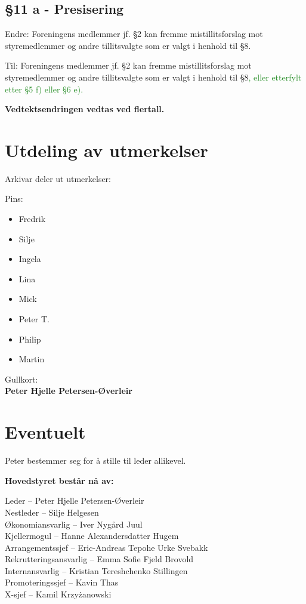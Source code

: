 \documentclass[10pt,norsk,a4paper,usenames,dvipsnames]{article}
\begin{document}
    \subsection{§11 a - Presisering}
    Endre:
    Foreningens medlemmer jf. §2 kan fremme mistillitsforslag mot styremedlemmer og andre tillitsvalgte som er valgt i henhold til §8.

    Til:
    Foreningens medlemmer jf. §2 kan fremme mistillitsforslag mot styremedlemmer og andre tillitsvalgte som er valgt i henhold til §8\textcolor{ForestGreen}{, eller etterfylt etter §5 f) eller §6 e).}

    \textbf{Vedtektsendringen vedtas ved flertall.}

\section{Utdeling av utmerkelser}

Arkivar deler ut utmerkelser:

Pins:
\begin{itemize}
    \item Fredrik
    \item Silje
    \item Ingela
    \item Lina
    \item Mick
    \item Peter T.
    \item Philip
    \item Martin
\end{itemize}

Gullkort: \\
\textbf{Peter Hjelle Petersen-Øverleir
}
\section{Eventuelt}

Peter bestemmer seg for å stille til leder allikevel.

\newpage

\textbf{\huge{Hovedstyret består nå av:}}

\mbox{}


\begin{center}
    \LARGE Leder -- Peter Hjelle Petersen-Øverleir
    \\ Nestleder -- Silje Helgesen
    \\ Økonomiansvarlig -- Iver Nygård Juul
    \\ Kjellermogul -- Hanne Alexandersdatter Hugem
    \\ Arrangementssjef -- Eric-Andreas Tepohe Urke Svebakk
    \\ Rekrutteringsansvarlig -- Emma Sofie Fjeld Brovold
    \\ Internansvarlig -- Kristian Tereshchenko Stillingen
    \\ Promoteringssjef -- Kavin Thas
    \\ X-sjef -- Kamil K\MakeLowercase{RZYŻANOWSKI}
\end{center}
\end{document}

